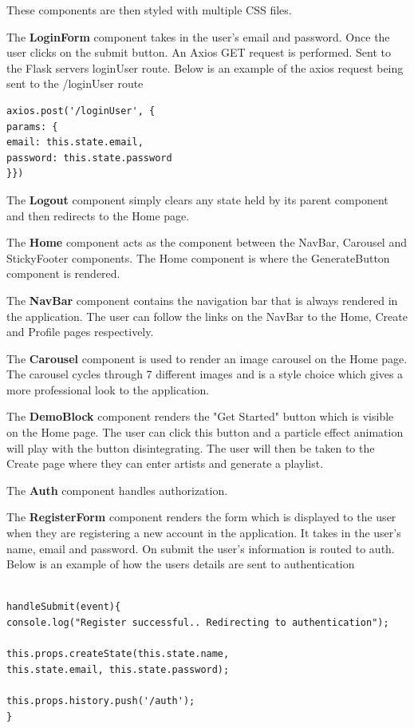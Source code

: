 These components are then styled with multiple CSS files.\newline


The \textbf{LoginForm} component takes in the user’s email and password. Once the user clicks on the submit button. An Axios GET request is performed. Sent to the Flask servers loginUser route.\newline
Below is an example of the axios request being sent to the /loginUser route\newline
\begin{verbatim} 
axios.post('/loginUser', {
params: {
email: this.state.email,
password: this.state.password
}})
\end{verbatim}

The \textbf{Logout} component simply clears any state held by its parent component and then redirects to the Home page.\newline

The \textbf{Home} component acts as the component between the NavBar, Carousel and StickyFooter components. The Home component is where the GenerateButton component is rendered.\newline

The \textbf{NavBar} component contains the navigation bar that is always rendered in the application. The user can follow the links on the NavBar to the Home, Create and Profile pages respectively.\newline

The \textbf{Carousel} component is used to render an image carousel on the Home page. The carousel cycles through 7 different images and is a style choice which gives a more professional look to the application.\newline

The \textbf{DemoBlock} component renders the "Get Started" button which is visible on the Home page. The user can click this button and a particle effect animation will play with the button disintegrating. The user will then be taken to the Create page where they can enter artists and generate a playlist.

The \textbf{Auth} component handles authorization.\newline

The \textbf{RegisterForm} component renders the form which is displayed to the user when they are registering a new account in the application. It takes in the user’s name, email and password. On submit the user’s information is routed to auth.\newline
Below is an example of how the users details are sent to authentication\newline
\begin{verbatim} 

handleSubmit(event){
console.log("Register successful.. Redirecting to authentication");

this.props.createState(this.state.name,
this.state.email, this.state.password);
		
this.props.history.push('/auth');
}
\end{verbatim}


